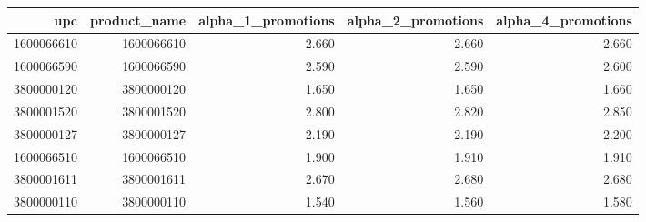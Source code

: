 \begin{tabular}{rrrrr}
\toprule
upc & product_name & alpha_1_promotions & alpha_2_promotions & alpha_4_promotions \\
\midrule
1600066610 & 1600066610 & 2.660 & 2.660 & 2.660 \\
1600066590 & 1600066590 & 2.590 & 2.590 & 2.600 \\
3800000120 & 3800000120 & 1.650 & 1.650 & 1.660 \\
3800001520 & 3800001520 & 2.800 & 2.820 & 2.850 \\
3800000127 & 3800000127 & 2.190 & 2.190 & 2.200 \\
1600066510 & 1600066510 & 1.900 & 1.910 & 1.910 \\
3800001611 & 3800001611 & 2.670 & 2.680 & 2.680 \\
3800000110 & 3800000110 & 1.540 & 1.560 & 1.580 \\
\bottomrule
\end{tabular}
